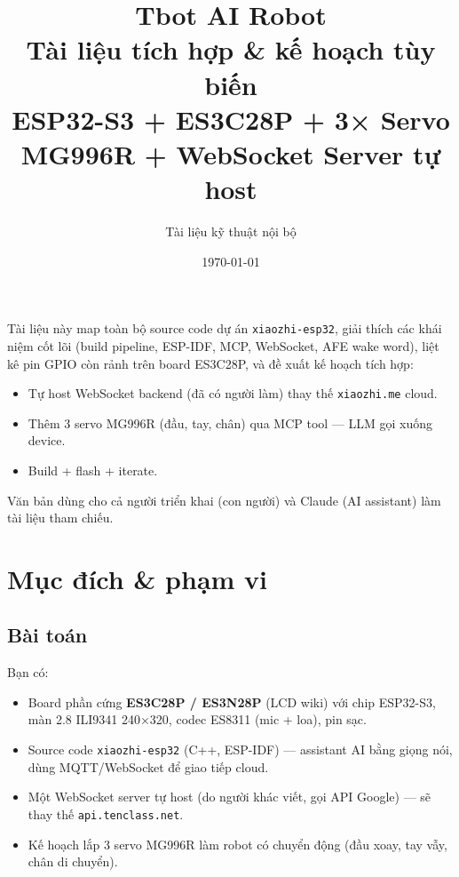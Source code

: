 \documentclass[11pt,a4paper]{article}
\title{
  \vspace*{1cm}
  \textbf{\Huge Tbot AI Robot}\\[6pt]
  \Large Tài liệu tích hợp \& kế hoạch tùy biến\\[2pt]
  \large ESP32-S3 + ES3C28P + 3× Servo MG996R + WebSocket Server tự host
}
\author{Tài liệu kỹ thuật nội bộ}
\date{\today}
\begin{document}
\maketitle
\thispagestyle{empty}

\vspace{0.6cm}
\begin{tcolorbox}[notebox,title={Tóm tắt}]
Tài liệu này map toàn bộ source code dự án \texttt{xiaozhi-esp32}, giải thích các khái niệm cốt lõi (build pipeline, ESP-IDF, MCP, WebSocket, AFE wake word), liệt kê pin GPIO còn rảnh trên board ES3C28P, và đề xuất kế hoạch tích hợp:
\begin{itemize}
  \item Tự host WebSocket backend (đã có người làm) thay thế \texttt{xiaozhi.me} cloud.
  \item Thêm 3 servo MG996R (đầu, tay, chân) qua MCP tool — LLM gọi xuống device.
  \item Build + flash + iterate.
\end{itemize}
Văn bản dùng cho cả người triển khai (con người) và Claude (AI assistant) làm tài liệu tham chiếu.
\end{tcolorbox}

\newpage
\tableofcontents
\newpage

\section{Mục đích \& phạm vi}
\subsection{Bài toán}
Bạn có:
\begin{itemize}
  \item Board phần cứng \textbf{ES3C28P / ES3N28P} (LCD wiki) với chip ESP32-S3, màn 2.8\textquotesingle{} ILI9341 240×320, codec ES8311 (mic + loa), pin sạc.
  \item Source code \texttt{xiaozhi-esp32} (C++, ESP-IDF) — assistant AI bằng giọng nói, dùng MQTT/WebSocket để giao tiếp cloud.
  \item Một WebSocket server tự host (do người khác viết, gọi API Google) — sẽ thay thế \texttt{api.tenclass.net}.
  \item Kế hoạch lắp 3 servo MG996R làm robot có chuyển động (đầu xoay, tay vẫy, chân di chuyển).
\end{itemize}
\end{document}
